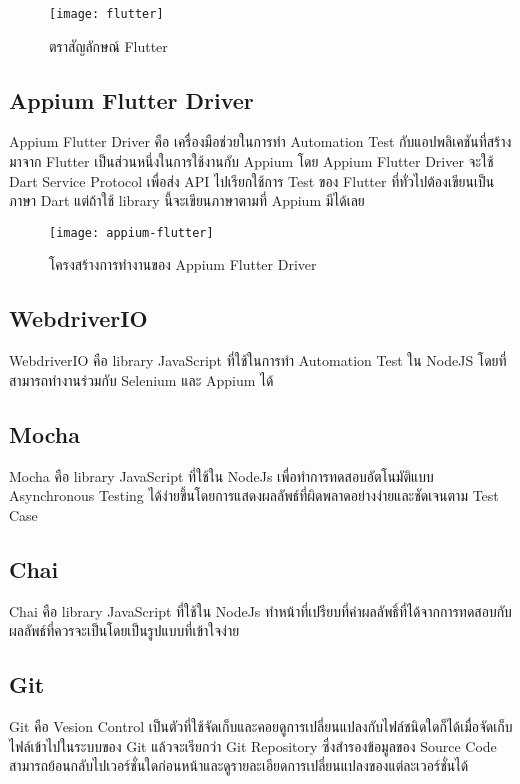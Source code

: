         \begin{figure}[H]
            \centering
            \texttt{[image: flutter]}
            \caption{ตราสัญลักษณ์ Flutter}\label{flutter}
        \end{figure}

    \subsection{Appium Flutter Driver}
        Appium Flutter Driver คือ เครื่องมือช่วยในการทำ Automation Test กับแอปพลิเคชันที่สร้างมาจาก Flutter เป็นส่วนหนึ่งในการใช้งานกับ Appium โดย Appium Flutter Driver จะใช้ Dart Service Protocol เพื่อส่ง API ไปเรียกใช้การ Test ของ Flutter ที่ทั่วไปต้องเขียนเป็นภาษา Dart แต่ถ้าใช้ library นี้จะเขียนภาษาตามที่ Appium มีได้เลย

        \begin{figure}[H]
            \centering
            \texttt{[image: appium-flutter]}
            \caption{โครงสร้างการทำงานของ Appium Flutter Driver}\label{appium-flutter}
        \end{figure}

    \subsection{WebdriverIO}
        WebdriverIO คือ library JavaScript ที่ใช้ในการทำ Automation Test ใน NodeJS โดยที่สามารถทำงานร่วมกับ Selenium และ Appium ได้
        
    \subsection{Mocha}
        Mocha คือ library JavaScript ที่ใช้ใน NodeJs เพื่อทำการทดสอบอัตโนมัติแบบ Asynchronous Testing ได้ง่ายขึ้นโดยการแสดงผลลัพธ์ที่ผิดพลาดอย่างง่ายและชัดเจนตาม Test Case

    \subsection{Chai}
        Chai คือ library JavaScript ที่ใช้ใน NodeJs ทำหน้าที่เปรียบที่ค่าผลลัพธิ์ที่ได้จากการทดสอบกับผลลัพธ์ที่ควรจะเป็นโดยเป็นรูปแบบที่เข้าใจง่าย

    \subsection{Git}
        Git คือ Vesion Control เป็นตัวที่ใช้จัดเก็บและคอยดูการเปลี่ยนแปลงกับไฟล์ชนิดใดก็ได้เมื่อจัดเก็บไฟล์เข้าไปในระบบของ Git แล้วจะเรียกว่า Git Repository ซึ่งสำรองข้อมูลของ Source Code สามารถย้อนกลับไปเวอร์ชั่นใดก่อนหน้าและดูรายละเอียดการเปลี่ยนแปลงของแต่ละเวอร์ชั่นได้

